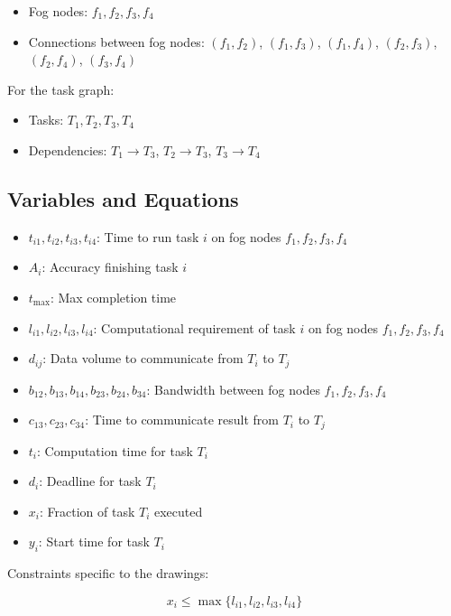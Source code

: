 \documentclass{article}
\begin{document}
\begin{itemize}
    \item Fog nodes: $f_1, f_2, f_3, f_4$
    \item Connections between fog nodes: $(f_1, f_2)$, $(f_1, f_3)$, $(f_1, f_4)$, $(f_2, f_3)$, $(f_2, f_4)$, $(f_3, f_4)$
\end{itemize}

For the task graph:

\begin{itemize}
    \item Tasks: $T_1, T_2, T_3, T_4$
    \item Dependencies: $T_1 \rightarrow T_3$, $T_2 \rightarrow T_3$, $T_3 \rightarrow T_4$
\end{itemize}

\subsection*{Variables and Equations}

\begin{itemize}
    \item $t_{i1}, t_{i2}, t_{i3}, t_{i4}$: Time to run task $i$ on fog nodes $f_1, f_2, f_3, f_4$
    \item $A_i$: Accuracy finishing task $i$
    \item $t_{\max}$: Max completion time
    \item $l_{i1}, l_{i2}, l_{i3}, l_{i4}$: Computational requirement of task $i$ on fog nodes $f_1, f_2, f_3, f_4$
    \item $d_{ij}$: Data volume to communicate from $T_i$ to $T_j$
    \item $b_{12}, b_{13}, b_{14}, b_{23}, b_{24}, b_{34}$: Bandwidth between fog nodes $f_1, f_2, f_3, f_4$
    \item $c_{13}, c_{23}, c_{34}$: Time to communicate result from $T_i$ to $T_j$
    \item $t_i$: Computation time for task $T_i$
    \item $d_i$: Deadline for task $T_i$
    \item $x_i$: Fraction of task $T_i$ executed
    \item $y_i$: Start time for task $T_i$
\end{itemize}

Constraints specific to the drawings:

\begin{equation}
    x_i \leq \max \{l_{i1}, l_{i2}, l_{i3}, l_{i4}\}
\end{equation}
\end{document}
